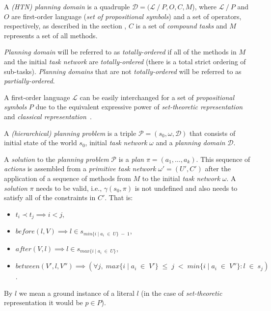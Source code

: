 \begin{defn}\label{def02:11}
    A \emph{(HTN) planning domain} is a quadruple $\mathcal{D} = (\mathcal{L} \ / \ P, O, C, M$), where $\mathcal{L} \ / \ P$ and $O$ are first-order language (\emph{set of propositional symbols}) and a set of operators, respectively, as described in the section , $C$ is a set of \emph{compound tasks} and $M$ represents a set of all methods.
    
    \emph{Planning domain} will be referred to as \emph{totally-ordered} if all of the methods in $M$ and the initial \emph{task network} are \emph{totally-ordered} (there is a total strict ordering of sub-tasks). \emph{Planning domains} that are not \emph{totally-ordered} will be referred to as \emph{partially-ordered}.
\end{defn}

\medskip\noindent
A first-order language $\mathcal{L}$ can be easily interchanged for a set of \emph{propositional symbols} $P$ due to the equivalent expressive power of \emph{set-theoretic representation} and \emph{classical representation}~\cite{nau}.

\begin{defn}\label{def02:12}
    A \emph{(hierarchical) planning problem} is a triple $\mathcal{P} = (s_0,\omega,\mathcal{D})$ that consists of initial state of the world $s_0$, initial \emph{task network} $\omega$ and a \emph{planning domain} $\mathcal{D}$.
\end{defn}

\begin{defn}\label{def02:13}%
    A \emph{solution} to the \emph{planning problem} $\mathcal{P}$ is a \emph{plan} $\pi=(a_1,\dots,a_k)$. This sequence of \emph{actions} is assembled from a \emph{primitive task network} $\omega'=(U',C')$ after the application of a sequence of methods from $M$ to the initial \emph{task network} $\omega$. A \emph{solution} $\pi$ needs to be valid, i.e., $\gamma(s_0,\pi)$ is not undefined and also needs to satisfy all of the constraints in $C'$. That is:
    
    \begin{itemize}
        \item $t_i \prec t_j \implies i < j$,
        \item $before(l,V) \implies l \in s_{min\{i \; | \; a_i \; \in \; U\} \; - \; 1}$,
        \item $after(V,l) \implies l \in s_{max\{i \; | \; a_i \; \in \; U\}}$,
        \item $between(V',l,V'') \implies (\forall j, \; max\{i \; | \; a_i \; \in \; V'\} \; \leq \; j \; < \; min\{i \; | \; a_i \; \in \; V''\}: l \; \in \; s_j)$.
    \end{itemize}
    
    By $l$ we mean a ground instance of a literal $l$ (in the case of \emph{set-theoretic} representation it would be $p \in P$).
\end{defn}


